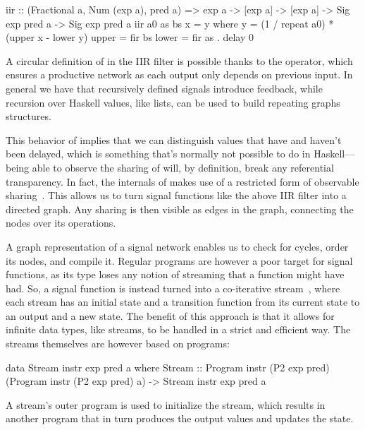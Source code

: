 \documentclass[../paper.tex]{subfiles}
\begin{document}
\begin{code}
iir :: (Fractional a, Num (exp a), pred a) => exp a -> [exp a] -> [exp a]
  -> Sig exp pred a -> Sig exp pred a
iir a0 as bs x = y
  where
    y = (1 / repeat a0) * (upper x - lower y)
    upper = fir bs
    lower = fir as . delay 0
\end{code}

A circular definition of  in the IIR filter is possible thanks to the  operator, which ensures a productive network as each output only depends on previous input. In general we have that recursively defined signals introduce feedback, while recursion over Haskell values, like lists, can be used to build repeating graphs structures.

This behavior of  implies that we can distinguish values that have and haven't been delayed, which is something that's normally not possible to do in Haskell---being able to observe the sharing of  will, by definition, break any referential transparency. In fact, the internals of  makes use of a restricted form of observable sharing~\cite{claessen1999, gill2009}. This allows us to turn signal functions like the above IIR filter into a directed graph. Any sharing is then visible as edges in the graph, connecting the nodes over its operations.

A graph representation of a signal network enables us to check for cycles, order its nodes, and compile it. Regular programs are however a poor target for signal functions, as its type loses any notion of streaming that a function might have had. So, a signal function is instead turned into a co-iterative stream~\cite{caspi1998}, where each stream has an initial state and a transition function from its current state to an output and a new state. The benefit of this approach is that it allows for infinite data types, like streams, to be handled in a strict and efficient way. The streams themselves are however based on programs:

\begin{code}
data Stream instr exp pred a where
  Stream :: Program instr (P2 exp pred) (Program instr (P2 exp pred) a)
    -> Stream instr exp pred a
\end{code}

\noindent A stream's outer program is used to initialize the stream, which results in another program that in turn produces the output values and updates the state.
\end{document}

